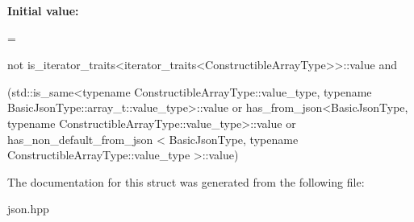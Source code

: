 {\bfseries Initial value\+:}
\begin{DoxyCode}
=
        
        
        
        
        
        not is\_iterator\_traits<iterator\_traits<ConstructibleArrayType>>::value and

        (std::is\_same<\textcolor{keyword}{typename} ConstructibleArrayType::value\_type,
         \textcolor{keyword}{typename} BasicJsonType::array\_t::value\_type>::value or
         has\_from\_json<BasicJsonType,
         \textcolor{keyword}{typename} ConstructibleArrayType::value\_type>::value or
         has\_non\_default\_from\_json <
         BasicJsonType, \textcolor{keyword}{typename} ConstructibleArrayType::value\_type >::value)
\end{DoxyCode}


The documentation for this struct was generated from the following file\+:\begin{DoxyCompactItemize}
\item 
json.\+hpp\end{DoxyCompactItemize}
